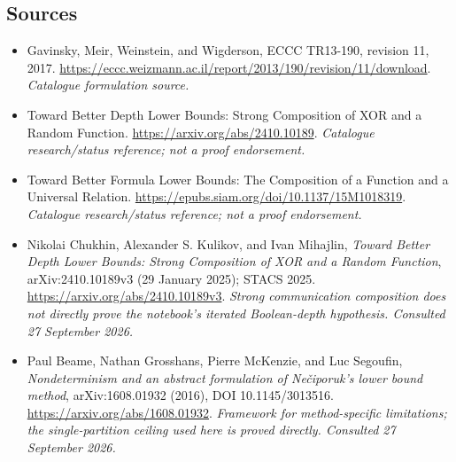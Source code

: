 \documentclass[11pt,a4paper]{article}
\numberwithin{equation}{section}
\begin{document}
\subsection{Sources}
\begin{itemize}\raggedright
\item[\textnormal{[S1]}]\hypertarget{source:statement:1}{} Gavinsky, Meir, Weinstein, and Wigderson, ECCC TR13-190, revision 11, 2017.
\url{https://eccc.weizmann.ac.il/report/2013/190/revision/11/download}.
{\small\textit{Catalogue formulation source.}}
\item[\textnormal{[S2]}]\hypertarget{source:statement:2}{} Toward Better Depth Lower Bounds: Strong Composition of XOR and a Random Function.
\url{https://arxiv.org/abs/2410.10189}.
{\small\textit{Catalogue research/status reference; not a proof endorsement.}}
\item[\textnormal{[S3]}]\hypertarget{source:statement:3}{} Toward Better Formula Lower Bounds: The Composition of a Function and a Universal Relation.
\url{https://epubs.siam.org/doi/10.1137/15M1018319}.
{\small\textit{Catalogue research/status reference; not a proof endorsement.}}

\item[\textnormal{[E1]}]\hypertarget{extra:statement:1}{} Nikolai Chukhin, Alexander S. Kulikov, and Ivan Mihajlin, \emph{Toward Better Depth Lower Bounds: Strong Composition of XOR and a Random Function}, arXiv:2410.10189v3 (29 January 2025); STACS 2025.
\url{https://arxiv.org/abs/2410.10189v3}.
{\small\textit{Strong communication composition does not directly prove the notebook's iterated Boolean-depth hypothesis. Consulted 27 September 2026.}}
\item[\textnormal{[E2]}]\hypertarget{extra:statement:2}{} Paul Beame, Nathan Grosshans, Pierre McKenzie, and Luc Segoufin, \emph{Nondeterminism and an abstract formulation of Nečiporuk's lower bound method}, arXiv:1608.01932 (2016), DOI 10.1145/3013516.
\url{https://arxiv.org/abs/1608.01932}.
{\small\textit{Framework for method-specific limitations; the single-partition ceiling used here is proved directly. Consulted 27 September 2026.}}
\end{itemize}
\end{document}

